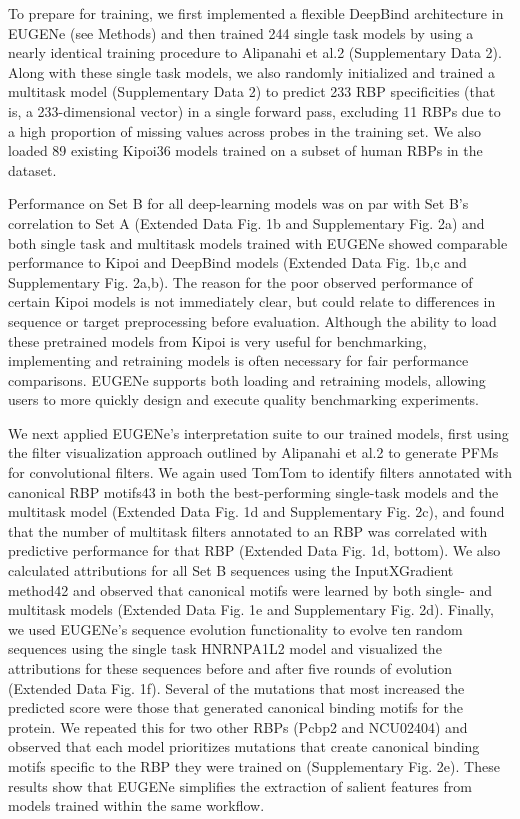 To prepare for training, we first implemented a flexible DeepBind architecture in EUGENe (see Methods) and then trained 244 single task models by using a nearly identical training procedure to Alipanahi et al.2 (Supplementary Data 2). Along with these single task models, we also randomly initialized and trained a multitask model (Supplementary Data 2) to predict 233 RBP specificities (that is, a 233-dimensional vector) in a single forward pass, excluding 11 RBPs due to a high proportion of missing values across probes in the training set. We also loaded 89 existing Kipoi36 models trained on a subset of human RBPs in the dataset.

Performance on Set B for all deep-learning models was on par with Set B’s correlation to Set A (Extended Data Fig. 1b and Supplementary Fig. 2a) and both single task and multitask models trained with EUGENe showed comparable performance to Kipoi and DeepBind models (Extended Data Fig. 1b,c and Supplementary Fig. 2a,b). The reason for the poor observed performance of certain Kipoi models is not immediately clear, but could relate to differences in sequence or target preprocessing before evaluation. Although the ability to load these pretrained models from Kipoi is very useful for benchmarking, implementing and retraining models is often necessary for fair performance comparisons. EUGENe supports both loading and retraining models, allowing users to more quickly design and execute quality benchmarking experiments.

We next applied EUGENe’s interpretation suite to our trained models, first using the filter visualization approach outlined by Alipanahi et al.2 to generate PFMs for convolutional filters. We again used TomTom to identify filters annotated with canonical RBP motifs43 in both the best-performing single-task models and the multitask model (Extended Data Fig. 1d and Supplementary Fig. 2c), and found that the number of multitask filters annotated to an RBP was correlated with predictive performance for that RBP (Extended Data Fig. 1d, bottom). We also calculated attributions for all Set B sequences using the InputXGradient method42 and observed that canonical motifs were learned by both single- and multitask models (Extended Data Fig. 1e and Supplementary Fig. 2d). Finally, we used EUGENe’s sequence evolution functionality to evolve ten random sequences using the single task HNRNPA1L2 model and visualized the attributions for these sequences before and after five rounds of evolution (Extended Data Fig. 1f). Several of the mutations that most increased the predicted score were those that generated canonical binding motifs for the protein. We repeated this for two other RBPs (Pcbp2 and NCU02404) and observed that each model prioritizes mutations that create canonical binding motifs specific to the RBP they were trained on (Supplementary Fig. 2e). These results show that EUGENe simplifies the extraction of salient features from models trained within the same workflow.

